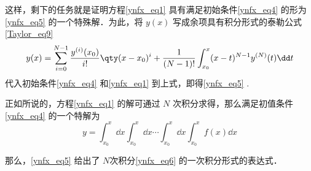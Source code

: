 这样，剩下的任务就是证明方程\autoref{ynfx_eq1} 具有满足初始条件\autoref{ynfx_eq4} 的形为\autoref{ynfx_eq5} 的一个特殊解．为此，将 $y(x)$ 写成余项具有积分形式的泰勒公式\autoref{Taylor_eq9}~
\begin{equation}
y(x)=\sum_{i=0}^{N-1}\frac{y^{(i)}(x_0)}{i!}\qty(x-x_0)^{i}+\frac{1}{(N-1)!}\int_{x_0}^{x}(x-t)^{N-1}y^{(N)}(t)\dd t
\end{equation}
代入初始条件\autoref{ynfx_eq4} 和\autoref{ynfx_eq1} 到上式，即得\autoref{ynfx_eq5} .

正如所说的，方程\autoref{ynfx_eq1} 的解可通过 $N$ 次积分求得，那么满足初值条件\autoref{ynfx_eq4} 的一个特解为
\begin{equation}\label{ynfx_eq6}
y=\int_{x_0}^x\dd x\int_{x_0}^x\dd x\cdots\int_{x_0}^{x}\dd x\int_{x_0}^{x}f(x)\dd x
\end{equation}

那么，\autoref{ynfx_eq5} 给出了 $N$次积分\autoref{ynfx_eq6} 的一次积分形式的表达式．